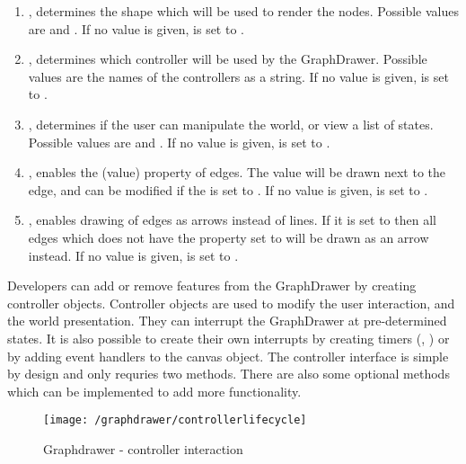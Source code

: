 \begin{enumerate}
    \item {}, determines the shape which will be used to render the nodes. Possible values are  and . If no value is given,  is set to .
    \item {}, determines which controller will be used by the GraphDrawer. Possible values are the names of the controllers as a string. If no value is given,  is set to .
    \item  {}, determines if the user can manipulate the world, or view a list of states. Possible values are  and . If no value is given,  is set to .
    \item {}, enables the  (value) property of edges. The value will be drawn next to the edge, and can be modified if the  is set to . If no value is given,  is set to .
    \item {}, enables drawing of edges as arrows instead of lines. If it is set to  then all edges which does not have the  property set to  will be drawn as an arrow instead. If no value is given,  is set to .
\end{enumerate}
Developers can add or remove features from the GraphDrawer by creating controller objects. Controller objects are used to modify the user interaction, and the world presentation. They can interrupt the GraphDrawer at pre-determined states. It is also possible to create their own interrupts by creating timers (, ) or by adding event handlers to the canvas object. The controller interface is simple by design and only requries two methods. There are also some optional methods which can be implemented to add more functionality.
\begin{figure}[H]
    \centering
    \texttt{[image: /graphdrawer/controllerlifecycle]}
    \caption{Graphdrawer - controller interaction}
    \label{fig:graphdrawerControllerLifeCycle}
\end{figure}

